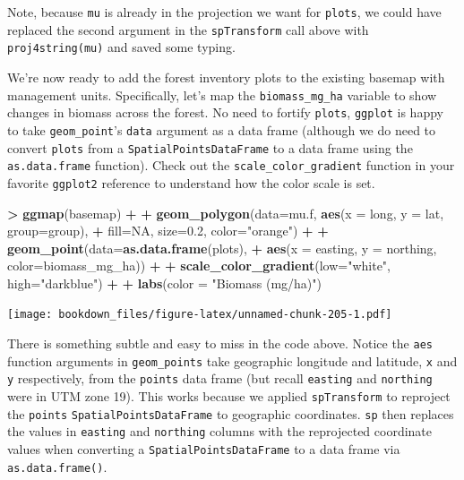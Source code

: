 \documentclass[]{krantz}
\makeatletter
\newenvironment{Shaded}{\begin{snugshade}}{\end{snugshade}}
\newcommand{\KeywordTok}[1]{\textcolor[rgb]{0.27,0.27,0.27}{\textbf{#1}}}
\newcommand{\DataTypeTok}[1]{\textcolor[rgb]{0.27,0.27,0.27}{#1}}
\newcommand{\FloatTok}[1]{\textcolor[rgb]{0.06,0.06,0.06}{#1}}
\newcommand{\StringTok}[1]{\textcolor[rgb]{0.5,0.5,0.5}{#1}}
\newcommand{\OtherTok}[1]{\textcolor[rgb]{0.37,0.37,0.37}{#1}}
\newcommand{\OperatorTok}[1]{\textcolor[rgb]{0.43,0.43,0.43}{\textbf{#1}}}
\newcommand{\NormalTok}[1]{#1}
\newenvironment{kframe}{%
\medskip{}
\setlength{\fboxsep}{.8em}
 \def\at@end@of@kframe{}%
 \ifinner\ifhmode%
  \def\at@end@of@kframe{\end{minipage}}%
  \begin{minipage}{\columnwidth}%
 \fi\fi%
 \def\FrameCommand##1{\hskip\@totalleftmargin \hskip-\fboxsep
 \colorbox{shadecolor}{##1}\hskip-\fboxsep
     \hskip-\linewidth \hskip-\@totalleftmargin \hskip\columnwidth}%
 \MakeFramed {\advance\hsize-\width
   \@totalleftmargin\z@ \linewidth\hsize
   \@setminipage}}%
 {\par\unskip\endMakeFramed%
 \at@end@of@kframe}
\renewenvironment{Shaded}{\begin{kframe}}{\end{kframe}}
\makeatother
\begin{document}
Note, because \texttt{mu} is already in the projection we want for
\texttt{plots}, we could have replaced the second argument in the
\texttt{spTransform} call above with \texttt{proj4string(mu)} and saved
some typing.

We're now ready to add the forest inventory plots to the existing
basemap with management units. Specifically, let's map the
\texttt{biomass\_mg\_ha} variable to show changes in biomass across the
forest. No need to fortify \texttt{plots}, \texttt{ggplot} is happy to
take \texttt{geom\_point}'s \texttt{data} argument as a data frame
(although we do need to convert \texttt{plots} from a
\texttt{SpatialPointsDataFrame} to a data frame using the
\texttt{as.data.frame} function). Check out the
\texttt{scale\_color\_gradient} function in your favorite
\texttt{ggplot2} reference to understand how the color scale is set.

\begin{Shaded}
\begin{Highlighting}[]
\OperatorTok{>}\StringTok{ }\KeywordTok{ggmap}\NormalTok{(basemap) }\OperatorTok{+}
\OperatorTok{+}\StringTok{     }\KeywordTok{geom_polygon}\NormalTok{(}\DataTypeTok{data=}\NormalTok{mu.f, }\KeywordTok{aes}\NormalTok{(}\DataTypeTok{x =}\NormalTok{ long, }\DataTypeTok{y =}\NormalTok{ lat, }\DataTypeTok{group=}\NormalTok{group), }
\OperatorTok{+}\StringTok{                  }\DataTypeTok{fill=}\OtherTok{NA}\NormalTok{, }\DataTypeTok{size=}\FloatTok{0.2}\NormalTok{, }\DataTypeTok{color=}\StringTok{"orange"}\NormalTok{) }\OperatorTok{+}
\OperatorTok{+}\StringTok{     }\KeywordTok{geom_point}\NormalTok{(}\DataTypeTok{data=}\KeywordTok{as.data.frame}\NormalTok{(plots), }
\OperatorTok{+}\StringTok{                }\KeywordTok{aes}\NormalTok{(}\DataTypeTok{x =}\NormalTok{ easting, }\DataTypeTok{y =}\NormalTok{ northing, }\DataTypeTok{color=}\NormalTok{biomass_mg_ha)) }\OperatorTok{+}\StringTok{ }
\OperatorTok{+}\StringTok{     }\KeywordTok{scale_color_gradient}\NormalTok{(}\DataTypeTok{low=}\StringTok{"white"}\NormalTok{, }\DataTypeTok{high=}\StringTok{"darkblue"}\NormalTok{) }\OperatorTok{+}
\OperatorTok{+}\StringTok{     }\KeywordTok{labs}\NormalTok{(}\DataTypeTok{color =} \StringTok{"Biomass (mg/ha)"}\NormalTok{)}
\end{Highlighting}
\end{Shaded}

\texttt{[image: bookdown\_files/figure-latex/unnamed-chunk-205-1.pdf]}

There is something subtle and easy to miss in the code above. Notice the
\texttt{aes} function arguments in \texttt{geom\_points} take geographic
longitude and latitude, \texttt{x} and \texttt{y} respectively, from the
\texttt{points} data frame (but recall \texttt{easting} and
\texttt{northing} were in UTM zone 19). This works because we applied
\texttt{spTransform} to reproject the \texttt{points}
\texttt{SpatialPointsDataFrame} to geographic coordinates. \texttt{sp}
then replaces the values in \texttt{easting} and \texttt{northing}
columns with the reprojected coordinate values when converting a
\texttt{SpatialPointsDataFrame} to a data frame via
\texttt{as.data.frame()}.
\end{document}

